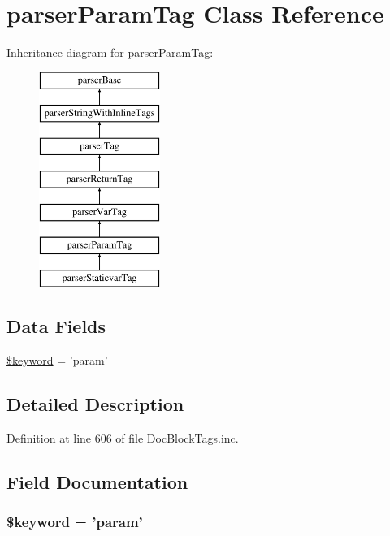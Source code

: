 \hypertarget{classparser_param_tag}{\section{parser\-Param\-Tag \-Class \-Reference}
\label{classparser_param_tag}
}
\-Inheritance diagram for parser\-Param\-Tag\-:\begin{figure}[H]
\begin{center}
\leavevmode
\includegraphics[height=7.000000cm]{classparser_param_tag}
\end{center}
\end{figure}
\subsection*{\-Data \-Fields}
\begin{DoxyCompactItemize}
\item 
\hyperlink{classparser_param_tag_a4a925d6b38bcf3957c713a7d3dc7da1f}{\$keyword} = 'param'
\end{DoxyCompactItemize}


\subsection{\-Detailed \-Description}


\-Definition at line 606 of file \-Doc\-Block\-Tags.\-inc.



\subsection{\-Field \-Documentation}
\hypertarget{classparser_param_tag_a4a925d6b38bcf3957c713a7d3dc7da1f}{
\subsubsection[{\$keyword}]{\setlength{\rightskip}{0pt plus 5cm}\$keyword = 'param'}}\label{classparser_param_tag_a4a925d6b38bcf3957c713a7d3dc7da1f}


